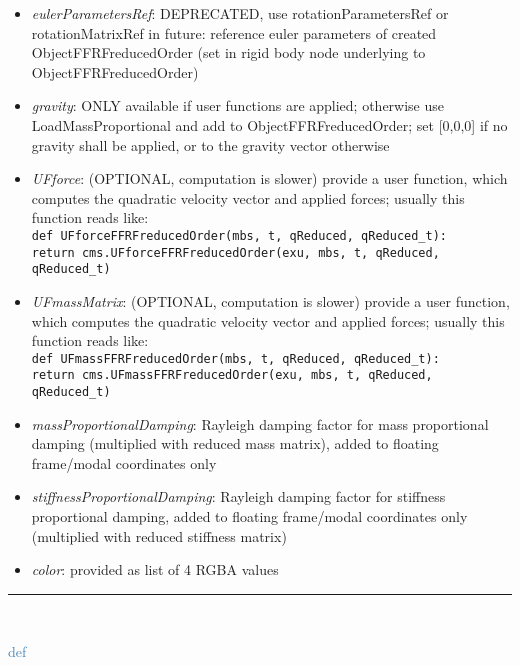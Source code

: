 \begin{itemize}[leftmargin=1.4cm]
\begin{itemize}[leftmargin=0.5cm]
\begin{itemize}[leftmargin=1.4cm]
\begin{itemize}[leftmargin=1.4cm]
\begin{itemize}[leftmargin=0.5cm]
\begin{itemize}[leftmargin=0.7cm]
\begin{itemize}[leftmargin=1.2cm]
    \item[] {\it   eulerParametersRef}: DEPRECATED, use rotationParametersRef or rotationMatrixRef in future: reference euler parameters of created ObjectFFRFreducedOrder (set in rigid body node underlying to ObjectFFRFreducedOrder)
    \item[] {\it   gravity}: ONLY available if user functions are applied; otherwise use LoadMassProportional and add to ObjectFFRFreducedOrder; set [0,0,0] if no gravity shall be applied, or to the gravity vector otherwise
    \item[] {\it   UFforce}: (OPTIONAL, computation is slower) provide a user function, which computes the quadratic velocity vector and applied forces; usually this function reads like:\\ \texttt{def UFforceFFRFreducedOrder(mbs, t, qReduced, qReduced\_t):\\ \phantom{XXXX}return cms.UFforceFFRFreducedOrder(exu, mbs, t, qReduced, qReduced\_t)}
    \item[] {\it   UFmassMatrix}: (OPTIONAL, computation is slower) provide a user function, which computes the quadratic velocity vector and applied forces; usually this function reads like:\\ \texttt{def UFmassFFRFreducedOrder(mbs, t, qReduced, qReduced\_t):\\  \phantom{XXXX}return cms.UFmassFFRFreducedOrder(exu, mbs, t, qReduced, qReduced\_t)}
    \item[] {\it   massProportionalDamping}: Rayleigh damping factor for mass proportional damping (multiplied with reduced mass matrix), added to floating frame/modal coordinates only
    \item[] {\it   stiffnessProportionalDamping}: Rayleigh damping factor for stiffness proportional damping, added to floating frame/modal coordinates only (multiplied with reduced stiffness matrix)
    \item[] {\it   color}: provided as list of 4 RGBA values
  \end{itemize}
\vspace{12pt}\end{itemize}
%
\noindent\rule{8cm}{0.75pt}\vspace{1pt} \\ 
\begin{flushleft}
\noindent \textcolor{steelblue}{def {\bf {}}}\label{sec:FEM:ObjectFFRFreducedOrderInterface:UFmassFFRFreducedOrder}

\end{flushleft}
\end{itemize}
\end{itemize}
\end{itemize}
\end{itemize}
\end{itemize}
